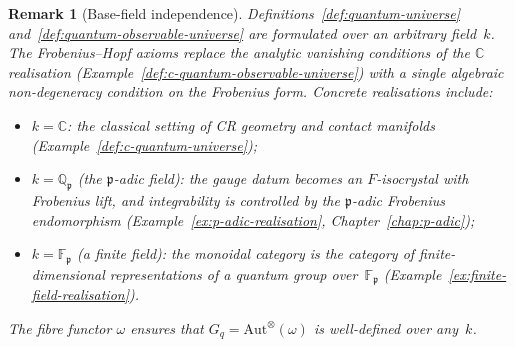 \documentclass[12pt,a4paper]{report}
\newtheorem{remark}[theorem]{Remark}
\newcommand{\pp}{\mathfrak{p}}
\begin{document}
\begin{remark}[Base-field independence]
\label{rem:base-field-independence}
Definitions~\ref{def:quantum-universe} and~\ref{def:quantum-observable-universe}
are formulated over an arbitrary field~$k$.  The Frobenius--Hopf axioms
replace the analytic vanishing conditions of the $\mathbb{C}$ realisation
(Example~\ref{def:c-quantum-observable-universe}) with a single algebraic
non-degeneracy condition on the Frobenius form.  Concrete realisations
include:
\begin{itemize}
  \item $k = \mathbb{C}$: the classical setting of CR geometry and contact
        manifolds (Example~\ref{def:c-quantum-universe});
  \item $k = \mathbb{Q}_\pp$ (the $\pp$-adic field): the gauge datum becomes
        an $F$-isocrystal with Frobenius lift, and integrability is controlled
        by the $\pp$-adic Frobenius endomorphism
        (Example~\ref{ex:p-adic-realisation},
        Chapter~\ref{chap:p-adic});
  \item $k = \mathbb{F}_\pp$ (a finite field): the monoidal category is
        the category of finite-dimensional representations of a quantum group
        over~$\mathbb{F}_\pp$
        (Example~\ref{ex:finite-field-realisation}).
\end{itemize}
The fibre functor $\omega$ ensures that $G_q = \mathrm{Aut}^{\otimes}(\omega)$
is well-defined over any~$k$.
\end{remark}
\end{document}
